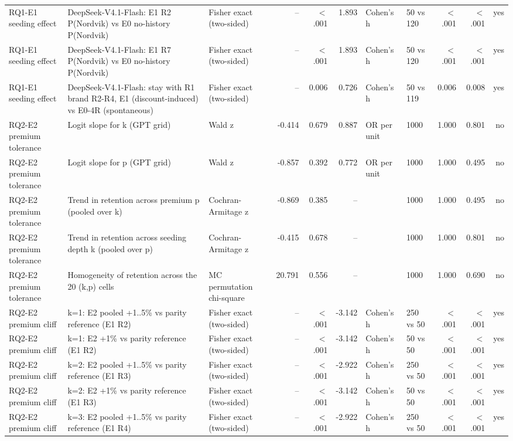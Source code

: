 \begin{table}[htbp]
\begin{tabular}{lllrrrllrrr}
RQ1-E1 seeding effect & DeepSeek-V4.1-Flash: E1 R2 P(Nordvik) vs E0 no-history P(Nordvik) & Fisher exact (two-sided) & -- & $<$.001 & 1.893 & Cohen's h & 50 vs 120 & $<$.001 & $<$.001 & yes \\
RQ1-E1 seeding effect & DeepSeek-V4.1-Flash: E1 R7 P(Nordvik) vs E0 no-history P(Nordvik) & Fisher exact (two-sided) & -- & $<$.001 & 1.893 & Cohen's h & 50 vs 120 & $<$.001 & $<$.001 & yes \\
RQ1-E1 seeding effect & DeepSeek-V4.1-Flash: stay with R1 brand R2-R4, E1 (discount-induced) vs E0-4R (spontaneous) & Fisher exact (two-sided) & -- & 0.006 & 0.726 & Cohen's h & 50 vs 119 & 0.006 & 0.008 & yes \\
RQ2-E2 premium tolerance & Logit slope for k (GPT grid) & Wald z & -0.414 & 0.679 & 0.887 & OR per unit & 1000 & 1.000 & 0.801 & no \\
RQ2-E2 premium tolerance & Logit slope for p (GPT grid) & Wald z & -0.857 & 0.392 & 0.772 & OR per unit & 1000 & 1.000 & 0.495 & no \\
RQ2-E2 premium tolerance & Trend in retention across premium p (pooled over k) & Cochran-Armitage z & -0.869 & 0.385 & -- &  & 1000 & 1.000 & 0.495 & no \\
RQ2-E2 premium tolerance & Trend in retention across seeding depth k (pooled over p) & Cochran-Armitage z & -0.415 & 0.678 & -- &  & 1000 & 1.000 & 0.801 & no \\
RQ2-E2 premium tolerance & Homogeneity of retention across the 20 (k,p) cells & MC permutation chi-square & 20.791 & 0.556 & -- &  & 1000 & 1.000 & 0.690 & no \\
RQ2-E2 premium cliff & k=1: E2 pooled +1..5\% vs parity reference (E1 R2) & Fisher exact (two-sided) & -- & $<$.001 & -3.142 & Cohen's h & 250 vs 50 & $<$.001 & $<$.001 & yes \\
RQ2-E2 premium cliff & k=1: E2 +1\% vs parity reference (E1 R2) & Fisher exact (two-sided) & -- & $<$.001 & -3.142 & Cohen's h & 50 vs 50 & $<$.001 & $<$.001 & yes \\
RQ2-E2 premium cliff & k=2: E2 pooled +1..5\% vs parity reference (E1 R3) & Fisher exact (two-sided) & -- & $<$.001 & -2.922 & Cohen's h & 250 vs 50 & $<$.001 & $<$.001 & yes \\
RQ2-E2 premium cliff & k=2: E2 +1\% vs parity reference (E1 R3) & Fisher exact (two-sided) & -- & $<$.001 & -3.142 & Cohen's h & 50 vs 50 & $<$.001 & $<$.001 & yes \\
RQ2-E2 premium cliff & k=3: E2 pooled +1..5\% vs parity reference (E1 R4) & Fisher exact (two-sided) & -- & $<$.001 & -2.922 & Cohen's h & 250 vs 50 & $<$.001 & $<$.001 & yes \\

\end{tabular}
\end{table}
